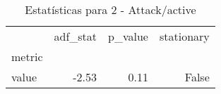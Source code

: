 \begin{table}[htbp]
\caption{Estatísticas para 2 - Attack/active}
\label{tab:2_-_attack_active_adf_test}
\begin{tabular}{lrrr}
\toprule
 & adf_stat & p_value & stationary \\
metric &  &  &  \\
\midrule
value & -2.53 & 0.11 & False \\
\bottomrule
\end{tabular}
\end{table}
